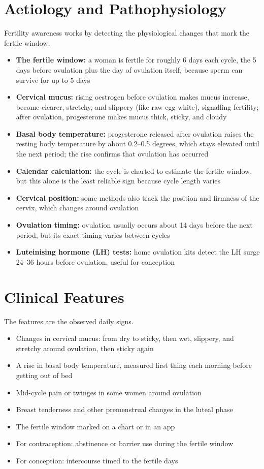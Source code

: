 \section*{Aetiology and Pathophysiology}
Fertility awareness works by detecting the physiological changes that mark the fertile window.
\begin{itemize}
    \item \textbf{The fertile window:} a woman is fertile for roughly 6 days each cycle, the 5 days before ovulation plus the day of ovulation itself, because sperm can survive for up to 5 days
    \item \textbf{Cervical mucus:} rising oestrogen before ovulation makes mucus increase, become clearer, stretchy, and slippery (like raw egg white), signalling fertility; after ovulation, progesterone makes mucus thick, sticky, and cloudy
    \item \textbf{Basal body temperature:} progesterone released after ovulation raises the resting body temperature by about 0.2--0.5 degrees, which stays elevated until the next period; the rise confirms that ovulation has occurred
    \item \textbf{Calendar calculation:} the cycle is charted to estimate the fertile window, but this alone is the least reliable sign because cycle length varies
    \item \textbf{Cervical position:} some methods also track the position and firmness of the cervix, which changes around ovulation
    \item \textbf{Ovulation timing:} ovulation usually occurs about 14 days before the next period, but its exact timing varies between cycles
    \item \textbf{Luteinising hormone (LH) tests:} home ovulation kits detect the LH surge 24--36 hours before ovulation, useful for conception
\end{itemize}

\section*{Clinical Features}
The features are the observed daily signs.
\begin{itemize}
    \item Changes in cervical mucus: from dry to sticky, then wet, slippery, and stretchy around ovulation, then sticky again
    \item A rise in basal body temperature, measured first thing each morning before getting out of bed
    \item Mid-cycle pain or twinges in some women around ovulation
    \item Breast tenderness and other premenstrual changes in the luteal phase
    \item The fertile window marked on a chart or in an app
    \item For contraception: abstinence or barrier use during the fertile window
    \item For conception: intercourse timed to the fertile days
\end{itemize}

